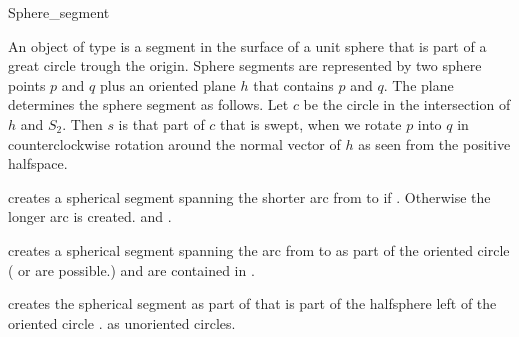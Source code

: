
\begin{ccRefClass}{Sphere_segment}

\ccDefinition

An object  of type  is a segment in the
surface of a unit sphere that is part of a great circle trough the
origin. Sphere segments are represented by two sphere points $p$ and
$q$ plus an oriented plane $h$ that contains $p$ and $q$. The plane
determines the sphere segment as follows. Let $c$ be the circle in the
intersection of $h$ and $S_2$. Then $s$ is that part of $c$ that is
swept, when we rotate $p$ into $q$ in counterclockwise rotation around
the normal vector of $h$ as seen from the positive halfspace.

\ccSetOneOfTwoColumns{4cm}

\ccCreation


{ creates a spherical segment spanning
  the shorter arc from  to  if . Otherwise the longer arc is created. \ccPrecond {} and .  }

{ creates a spherical segment spanning the
  arc from  to  as part of the oriented circle 
  ( or  are possible.)
  \ccPrecond {} and  are contained in .  }

{ creates the spherical segment as part of  that is part
  of the halfsphere left of the oriented circle .  \ccPrecond
   as unoriented circles.  }

\ccSetTwoOfThreeColumns{3.5cm}{2.5cm}

\ccOperations





\end{ccRefClass}
